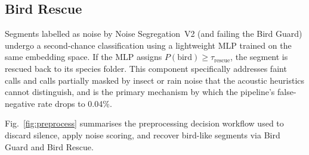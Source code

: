 \documentclass[conference]{IEEEtran}
\begin{document}
\subsection{Bird Rescue}
Segments labelled as noise by Noise Segregation~V2 (and failing the Bird Guard) undergo a second-chance classification using a lightweight MLP trained on the same embedding space. If the MLP assigns $P(\text{bird}) \geq \tau_\text{rescue}$, the segment is rescued back to its species folder. This component specifically addresses faint calls and calls partially masked by insect or rain noise that the acoustic heuristics cannot distinguish, and is the primary mechanism by which the pipeline's false-negative rate drops to 0.04\%.

Fig.~\ref{fig:preprocess} summarises the preprocessing decision workflow used to discard silence, apply noise scoring, and recover bird-like segments via Bird Guard and Bird Rescue.
\end{document}

